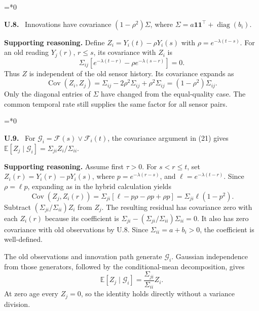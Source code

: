 \documentclass[12pt,letterpaper]{article}
\newcommand{\E}{\mathbb E}
\newcommand{\Cov}{\operatorname{Cov}}
\newcommand{\G}{\mathcal G}
\newenvironment{proofstep}[2]{%
  \begin{list}{}{\leftmargin=\dimexpr 0.17in*#2\relax%
  \setlength{\rightmargin}{0pt}\setlength{\topsep}{5pt}\setlength{\parsep}{2pt}}%
  \item[]\textbf{\textcolor{ink}{#1.}}\ }{\end{list}}
\begin{document}
\begin{proofstep}{U.8}{0}
\label{step:U.8}
Innovations have covariance $(1-\rho^2)\Sigma$, where $\Sigma=a\mathbf1\mathbf1^\top+\operatorname{diag}(b_i)$.

\textbf{Supporting reasoning.}
Define $Z_i=Y_i(t)-\rho Y_i(s)$ with $\rho=e^{-\lambda(t-s)}$. For an old reading $Y_j(r)$, $r\le s$, its covariance with $Z_i$ is
\[
\Sigma_{ij}[e^{-\lambda(t-r)}-\rho e^{-\lambda(s-r)}]=0.
\]
Thus $Z$ is independent of the old sensor history. Its covariance expands as
\[
\Cov(Z_i,Z_j)=\Sigma_{ij}-2\rho^2\Sigma_{ij}+\rho^2\Sigma_{ij}
=(1-\rho^2)\Sigma_{ij}.
\]
Only the diagonal entries of $\Sigma$ have changed from the equal-quality case. The common temporal rate still supplies the same factor for all sensor pairs.
\par{}
\end{proofstep}

\begin{proofstep}{U.9}{0}
\label{step:U.9}
For $\mathcal G_i=\mathcal F(s)\vee\mathcal F_i(t)$, the covariance argument in (21) gives $\E[Z_j\mid\mathcal G_i]=\Sigma_{ji}Z_i/\Sigma_{ii}$.

\textbf{Supporting reasoning.}
Assume first $\tau>0$. For $s<r\le t$, set $Z_i(r)=Y_i(r)-pY_i(s)$, where $p=e^{-\lambda(r-s)}$, and $\ell=e^{-\lambda(t-r)}$. Since $\rho=\ell p$, expanding as in the hybrid calculation yields
\[
\Cov(Z_j,Z_i(r))=\Sigma_{ji}[\ell-p\rho-\rho p+\rho p]
=\Sigma_{ji}\ell(1-p^2).
\]
Subtract $(\Sigma_{ji}/\Sigma_{ii})Z_i$ from $Z_j$. The resulting residual has covariance zero with each $Z_i(r)$ because its coefficient is $\Sigma_{ji}-(\Sigma_{ji}/\Sigma_{ii})\Sigma_{ii}=0$. It also has zero covariance with old observations by U.8. Since $\Sigma_{ii}=a+b_i>0$, the coefficient is well-defined.

The old observations and innovation path generate $\G_i$. Gaussian independence from those generators, followed by the conditional-mean decomposition, gives
\[
\E[Z_j\mid\G_i]=\frac{\Sigma_{ji}}{\Sigma_{ii}}Z_i.
\]
At zero age every $Z_j=0$, so the identity holds directly without a variance division.
\par{}
\end{proofstep}
\end{document}
